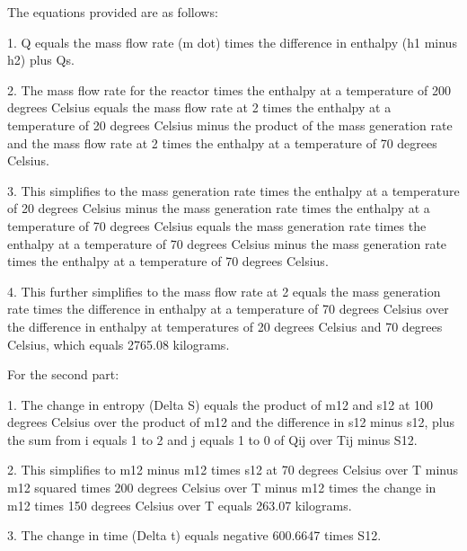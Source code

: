 The equations provided are as follows:

1. Q equals the mass flow rate (m dot) times the difference in enthalpy (h1 minus h2) plus Qs.

2. The mass flow rate for the reactor times the enthalpy at a temperature of 200 degrees Celsius equals the mass flow rate at 2 times the enthalpy at a temperature of 20 degrees Celsius minus the product of the mass generation rate and the mass flow rate at 2 times the enthalpy at a temperature of 70 degrees Celsius.

3. This simplifies to the mass generation rate times the enthalpy at a temperature of 20 degrees Celsius minus the mass generation rate times the enthalpy at a temperature of 70 degrees Celsius equals the mass generation rate times the enthalpy at a temperature of 70 degrees Celsius minus the mass generation rate times the enthalpy at a temperature of 70 degrees Celsius.

4. This further simplifies to the mass flow rate at 2 equals the mass generation rate times the difference in enthalpy at a temperature of 70 degrees Celsius over the difference in enthalpy at temperatures of 20 degrees Celsius and 70 degrees Celsius, which equals 2765.08 kilograms.

For the second part:

1. The change in entropy (Delta S) equals the product of m12 and s12 at 100 degrees Celsius over the product of m12 and the difference in s12 minus s12, plus the sum from i equals 1 to 2 and j equals 1 to 0 of Qij over Tij minus S12.

2. This simplifies to m12 minus m12 times s12 at 70 degrees Celsius over T minus m12 squared times 200 degrees Celsius over T minus m12 times the change in m12 times 150 degrees Celsius over T equals 263.07 kilograms.

3. The change in time (Delta t) equals negative 600.6647 times S12.